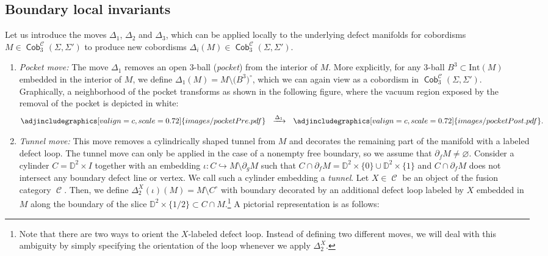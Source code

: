 \documentclass[10pt,a4paper]{amsart}
\DeclareMathOperator{\Cob}{\mathsf{Cob}}
\DeclareMathOperator{\calc}{\mathcal{C}}
\numberwithin{equation}{section}
\theoremstyle{definition}
\begin{document}
\subsection{Boundary local invariants}
\label{subSecChar}
Let us introduce the moves $\Delta_1$, $\Delta_2$ and $\Delta_3$, which can be applied locally to the underlying defect manifolds for cobordisms $M \in \Cob_3^{\mathcal{C}}(\Sigma, \Sigma')$ to produce new cobordisms $\Delta_i(M) \in \Cob_3^{\mathcal{C}}(\Sigma, \Sigma')$.
\begin{enumerate}\itemsep=0pt
 \item \textit{Pocket move:} The move $\Delta_1$ removes an open 3-ball (\textit{pocket}) from the interior of $M$. More explicitly, for any 3-ball $B^3 \subset \mathrm{Int}(M) $ embedded in the interior of $M$, we define $\Delta_1(M) = M\setminus \bigl(B^3\bigr)^{\circ}$, which we can again view as a cobordism in $\Cob_3^{\mathcal{C}}(\Sigma, \Sigma')$. Graphically, a neighborhood of the pocket transforms as shown in the following figure, where the vacuum region exposed by the removal of the pocket is depicted in white:
 \begin{align*}
 \adjincludegraphics[valign=c, scale = 0.72]{images/pocketPre.pdf} \, \,\, \, \xrightarrow{\Delta_1} \,\,\,\,\adjincludegraphics[valign=c, scale = 0.72]{images/pocketPost.pdf}.
 \end{align*}
 \item \textit{Tunnel move:} This move removes a cylindrically shaped tunnel from $M$ and decorates the remaining part of the manifold with a labeled defect loop. The tunnel move can only be applied in the case of a nonempty free boundary, so we assume that $\partial_f M \neq \varnothing$. Consider a cylinder $C = \mathbb{D}^2 \times I$ together with an embedding $\iota\colon C \hookrightarrow M\setminus \partial_gM$ such that $C \cap \partial_f M = \mathbb{D}^2 \times \{0\} \cup \mathbb{D}^2 \times \{1\}$ and $C \cap \partial_f M$ does not intersect any boundary defect line or vertex. We call such a cylinder embedding a \textit{tunnel}. Let $X \in \calc$ be an object of the fusion category $\calc$. Then, we define $\Delta_2^X(\iota)(M) = M \setminus C^{\circ}$ with boundary decorated by an additional defect loop labeled by $X$ embedded in $M$ along the boundary of the slice $\mathbb{D}^2 \times \{1/2\} \subset C \cap M$.\footnote{Note that there are two ways to orient the $X$-labeled defect loop. Instead of defining two different moves, we will deal with this ambiguity by simply specifying the orientation of the loop whenever we apply $\Delta_2^X$.\label{footOrAmb}} A pictorial representation is as follows:

\end{enumerate}
\end{document}
